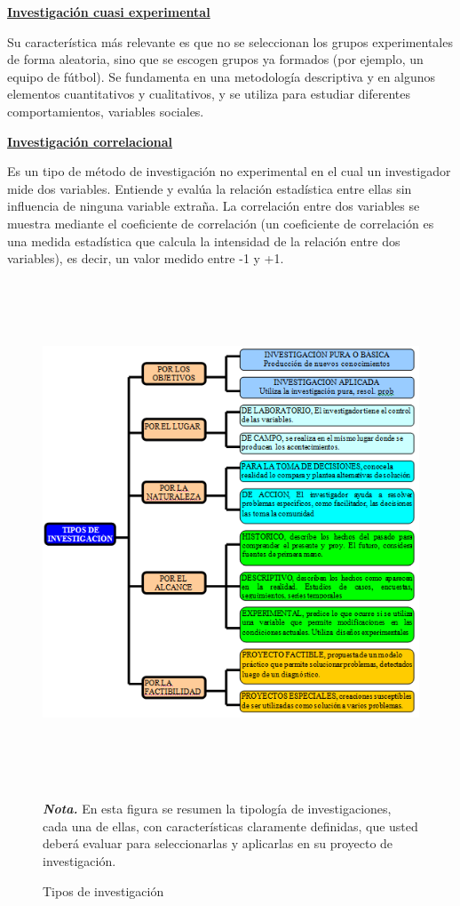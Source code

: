 \documentclass[12pt, a4paper, nofontenc, numbers=endperiod]{apa7}
\begin{document}
{\setlength{\parindent}{0cm}\textbf{\underline{Investigación cuasi experimental}} 
	
\setlength{\parindent}{1.27cm}Su característica más relevante es que no se seleccionan los grupos experimentales de forma aleatoria, sino que se escogen grupos ya formados (por ejemplo, un equipo de fútbol). Se fundamenta en una metodología descriptiva y en algunos elementos cuantitativos y cualitativos, y se utiliza para estudiar diferentes comportamientos, variables sociales.
	
	
\setlength{\parindent}{0cm}\textbf{\underline{Investigación correlacional}} 		
		
\setlength{\parindent}{1.27cm}Es un tipo de método de investigación no experimental en el cual un investigador mide dos variables. Entiende y evalúa la relación estadística entre ellas sin influencia de ninguna variable extraña. La correlación entre dos variables se muestra mediante el coeficiente de correlación (un coeficiente de correlación es una medida estadística que calcula la intensidad de la relación entre dos variables), es decir, un valor medido entre -1 y +1.
		
			\begin{figure}[h]
			\caption{Tipos de investigación}
			\label{Figura3} %
			\vspace*{0.1cm}
			\includegraphics[width=16cm,height=15cm]{Imagenes/Figura37}
			\begin{tablenotes}[para,flushleft]
				{\small
					\textit{\textbf{Nota.}} En esta figura se resumen la tipología de investigaciones, cada una de ellas, con características claramente definidas, que usted deberá evaluar para seleccionarlas y aplicarlas en su proyecto de investigación.
					
}
\end{tablenotes}
\end{figure}}
\end{document}
